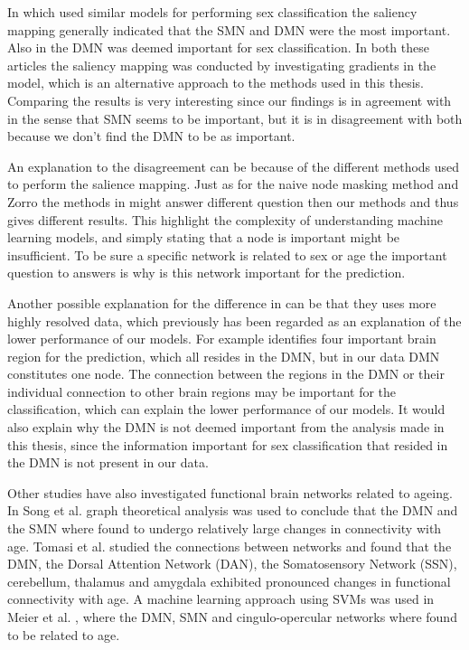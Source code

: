 In \cite{understanding_gnn} which used similar models for performing sex classification the saliency mapping generally indicated that the SMN and DMN were the most important. Also in \cite{arslan} the DMN was deemed important for sex classification. In both these articles the saliency mapping was conducted  by investigating gradients in the model, which is an alternative approach to the methods used in this thesis. Comparing the results is very interesting since our findings is in agreement with \cite{understanding_gnn} in the sense that SMN seems to be important, but it is in disagreement with both \cite{gin, arslan} because we don't find the DMN to be as important. 

An explanation to the disagreement can be because of the different methods used to perform the salience mapping. Just as for the naive node masking method and Zorro the methods in \cite{understanding_gnn, arslan} might answer different question then our methods and thus gives different results. This highlight the complexity of understanding machine learning models, and simply stating that a node is important might be insufficient. To be sure a specific network is related to sex or age the important question to answers is why is this network important for the prediction. 

Another possible explanation for the difference in \cite{understanding_gnn, arslan} can be that they uses more highly resolved data, which previously has been regarded as an explanation of the lower performance of our models. For example \cite{arslan} identifies four important brain region for the prediction, which all resides in the DMN, but in our data DMN constitutes one node. The connection between the regions in the DMN or their individual connection to other brain regions may be important for the classification, which can explain the lower performance of our models. It would also explain why the DMN is not deemed important from the analysis made in this thesis, since the information important for sex classification that resided in the DMN is not present in our data.

Other studies have also investigated functional brain networks related to ageing. In Song et al. \cite{song_reorganizational} graph theoretical analysis was used to conclude that the DMN and the SMN where found to undergo relatively large changes in connectivity with age. Tomasi et al. \cite{tomasi_aging} studied the connections between networks and found that the DMN, the Dorsal Attention Network (DAN), the Somatosensory Network (SSN), cerebellum, thalamus and amygdala exhibited pronounced changes in functional connectivity with age. A machine learning approach using SVMs was used in Meier et al. \cite{meier_svm}, where the DMN, SMN and cingulo-opercular networks where found to be related to age. 


